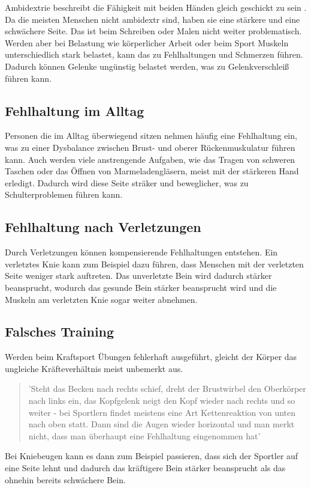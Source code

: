 
Ambidextrie beschreibt die Fähigkeit mit beiden Händen gleich geschickt zu sein \cite{wissen}. Da die meisten  Menschen nicht ambidextr sind, haben sie eine stärkere und eine schwächere Seite. Das ist beim Schreiben oder Malen nicht weiter problematisch. Werden aber bei Belastung wie körperlicher Arbeit oder beim Sport Muskeln unterschiedlich stark belastet, kann das zu Fehlhaltungen und Schmerzen führen. Dadurch können Gelenke ungünstig belastet werden, was zu Gelenkverschleiß führen kann.\\

 \subsection{Fehlhaltung im Alltag}
 Personen die im Alltag überwiegend sitzen nehmen häufig eine Fehlhaltung ein, was zu einer Dysbalance zwischen Brust- und oberer Rückenmuskulatur führen kann. Auch werden viele anstrengende Aufgaben, wie das Tragen von schweren Taschen oder das Öffnen von Marmeladengläsern, meist mit der stärkeren Hand erledigt. Dadurch wird diese Seite sträker und beweglicher, was zu Schulterproblemen führen kann.

 \subsection{Fehlhaltung nach Verletzungen}
 Durch Verletzungen können kompensierende Fehlhaltungen entstehen. Ein verletztes Knie kann zum Beispiel dazu führen, dass Menschen mit der verletzten Seite weniger stark auftreten. Das unverletzte Bein wird dadurch stärker beansprucht, wodurch das gesunde Bein stärker beansprucht wird und die Muskeln am verletzten Knie sogar weiter abnehmen.

 \subsection{Falsches Training}
Werden beim Kraftsport Übungen fehlerhaft ausgeführt, gleicht der Körper das ungleiche Kräfteverhältnis meist unbemerkt aus.

\begin{quote}
'Steht das Becken nach rechts schief, dreht der Brustwirbel den Oberkörper nach links ein, das Kopfgelenk neigt den Kopf wieder nach rechts und so weiter - bei Sportlern findet meistens eine Art Kettenreaktion von unten nach oben statt. Dann sind die Augen wieder horizontal und man merkt nicht, dass man überhaupt eine Fehlhaltung eingenommen hat' \cite{MensHealth}
\end{quote}
Bei Kniebeugen kann es dann zum Beispiel passieren, dass sich der Sportler auf eine Seite lehnt und dadurch das kräftigere Bein stärker beansprucht als das ohnehin bereits schwächere Bein. \\
\\

